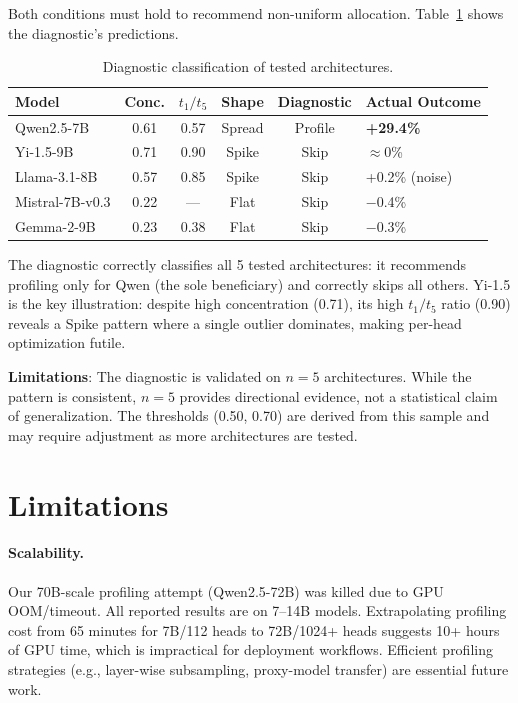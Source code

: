 \documentclass[11pt,a4paper]{article}
\begin{document}
Both conditions must hold to recommend non-uniform allocation. Table~\ref{tab:diagnostic} shows the diagnostic's predictions.

\begin{table}[h]
\centering
\caption{Diagnostic classification of tested architectures.}
\label{tab:diagnostic}
\small
\begin{tabular}{lccccl}
\toprule
Model & Conc. & $t_1/t_5$ & Shape & Diagnostic & Actual Outcome \\
\midrule
Qwen2.5-7B & 0.61 & 0.57 & Spread & Profile & \textbf{+29.4\%} \\
Yi-1.5-9B & 0.71 & 0.90 & Spike & Skip & $\approx$0\% \\
Llama-3.1-8B & 0.57 & 0.85 & Spike & Skip & +0.2\% (noise) \\
Mistral-7B-v0.3 & 0.22 & --- & Flat & Skip & $-$0.4\% \\
Gemma-2-9B & 0.23 & 0.38 & Flat & Skip & $-$0.3\% \\
\bottomrule
\end{tabular}
\end{table}

The diagnostic correctly classifies all 5 tested architectures: it recommends profiling only for Qwen (the sole beneficiary) and correctly skips all others.
Yi-1.5 is the key illustration: despite high concentration (0.71), its high $t_1/t_5$ ratio (0.90) reveals a Spike pattern where a single outlier dominates, making per-head optimization futile.

\textbf{Limitations}: The diagnostic is validated on $n\!=\!5$ architectures.
While the pattern is consistent, $n\!=\!5$ provides directional evidence, not a statistical claim of generalization.
The thresholds (0.50, 0.70) are derived from this sample and may require adjustment as more architectures are tested.

\section{Limitations}\label{sec:limitations}

\paragraph{Scalability.}
Our 70B-scale profiling attempt (Qwen2.5-72B) was killed due to GPU OOM/timeout.
All reported results are on 7--14B models.
Extrapolating profiling cost from 65 minutes for 7B/112 heads to 72B/1024+ heads suggests 10+ hours of GPU time, which is impractical for deployment workflows.
Efficient profiling strategies (e.g., layer-wise subsampling, proxy-model transfer) are essential future work.
\end{document}
